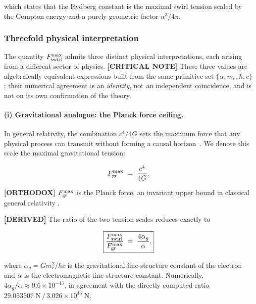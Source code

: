 \documentclass[11pt]{article}
\theoremstyle{definition}
\theoremstyle{plain}
\theoremstyle{remark}
\begin{document}
        which states that the Rydberg constant is the maximal swirl tension scaled by the Compton energy and a purely geometric factor $\alpha^3/4\pi$.

        \subsubsection{Threefold physical interpretation}

        The quantity $F_{\rm swirl}^{\max}$ admits three distinct physical interpretations, each arising from a different sector of physics. \textbf{[CRITICAL NOTE]} These three values are algebraically equivalent expressions built from the same primitive set $\{\alpha,m_e,\hbar,c\}$; their numerical agreement is an \emph{identity}, not an independent coincidence, and is not on its own confirmation of the theory.

        \paragraph{(i) Gravitational analogue: the Planck force ceiling.}

        In general relativity, the combination $c^4/4G$ sets the maximum force that any physical process can transmit without forming a causal horizon~\cite{Gibbons2002}. We denote this scale the maximal gravitational tension:

        \begin{align}
            F_{\rm gr}^{\max} \;=\; \frac{c^4}{4G}.
            \label{eq:Fgr}
        \end{align}

        \textbf{[ORTHODOX]} $F_{\rm gr}^{\max}$ is the Planck force, an invariant upper bound in classical general relativity \cite{Gibbons2002}.

        \textbf{[DERIVED]} The ratio of the two tension scales reduces exactly to

        \begin{align}
            \boxed{
            \frac{F_{\rm swirl}^{\max}}{F_{\rm gr}^{\max}}
            \;=\; \frac{4\alpha_g}{\alpha},
            }
            \label{eq:Fmax_ratio}
        \end{align}

        where $\alpha_g = Gm_e^2/\hbar c$ is the gravitational fine-structure constant of the electron and $\alpha$ is the electromagnetic fine-structure constant. Numerically, $4\alpha_g/\alpha \approx 9.6\times10^{-43}$, in agreement with the directly computed ratio $29.053507\;\text{N}\,/\,3.026\times10^{43}\;\text{N}$.
\end{document}
